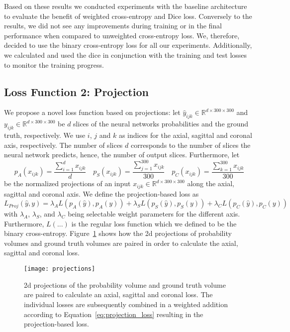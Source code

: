 Based on these results we conducted experiments with the baseline architecture to evaluate the benefit of weighted cross-entropy and Dice loss. Conversely to the results, we did not see any improvements during training or in the final performance when compared to unweighted cross-entropy loss. We, therefore, decided to use the binary cross-entropy loss for all our experiments. Additionally, we calculated and used the \acrlong{dice} in conjunction with the training and test losses to monitor the training progress.

\subsection{Loss Function 2: Projection} \label{sec:train_loss_proj}
We propose a novel loss function based on projections: let $\hat{y}_{ijk} \in \mathbb{R}^{d \times 300 \times 300}$ and $y_{ijk} \in \mathbb{R}^{d \times 300 \times 300}$ be $d$ slices of the neural networks probabilities and the ground truth, respectively. We use $i$, $j$ and $k$ as indices for the axial, sagittal and coronal axis, respectively. The number of slices $d$ corresponds to the number of slices the neural network predicts, hence, the number of output slices. Furthermore, let
\begin{equation}
   p_{A}(x_{ijk}) = \frac{\sum_{i=1}^{d} x_{ijk}}{d}
   \quad
   p_{S}(x_{ijk}) = \frac{\sum_{j=1}^{300} x_{ijk}}{300}
   \quad
   p_{C}(x_{ijk}) = \frac{\sum_{k=1}^{300} x_{ijk}}{300}
   \label{eq:projections}
\end{equation}
be the normalized projections of an input $x_{ijk} \in \mathbb{R}^{d \times 300 \times 300}$ along the axial, sagittal and coronal axis. We define the projection-based loss as
\begin{equation}
   L_{Proj}(\hat{y}, y) = \lambda_{A}L(p_{A}(\hat{y}), p_{A}(y)) + \lambda_{S}L(p_{S}(\hat{y}), p_{S}(y)) + \lambda_{C}L(p_{C}(\hat{y}), p_{C}(y))
   \label{eq:projection_loss}
\end{equation}
with $\lambda_{A}$, $\lambda_{S}$, and $\lambda_{C}$ being selectable weight parameters for the different axis. Furthermore, $L(...)$ is the regular loss function which we defined to be the binary cross-entropy.
Figure~\ref{fig:projections} shows how the \gls{2d} projections of probability volumes and ground truth volumes are paired in order to calculate the axial, sagittal and coronal loss.

\begin{figure}[htbp]	
	\texttt{[image: projections]}
    \caption[Projection-based Loss]{\gls{2d} projections of the probability volume and ground truth volume are paired to calculate an axial, sagittal and coronal loss. The individual losses are subsequently combined in a weighted addition according to Equation~\ref{eq:projection_loss} resulting in the projection-based loss.}
    \label{fig:projections}
\end{figure}

